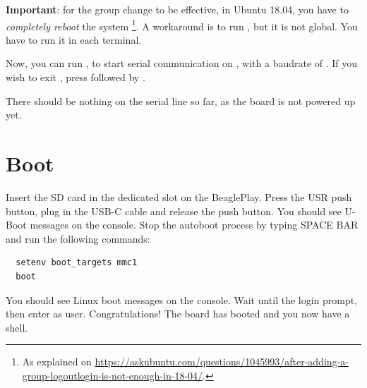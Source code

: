 
{\bf Important}: for the group change to be effective, in Ubuntu 18.04, you have to
{\em completely reboot} the system \footnote{As explained on
\url{https://askubuntu.com/questions/1045993/after-adding-a-group-logoutlogin-is-not-enough-in-18-04/}.}.
A workaround is to run , but it is not global.
You have to run it in each terminal.

Now, you can run , to start serial
communication on , with a baudrate of . If
you wish to exit , press \code{[Ctrl][a]} followed by
\code{[Ctrl][x]}.

There should be nothing on the serial line so far, as the board is not
powered up yet.

\section{Boot}

Insert the SD card in the dedicated slot on the BeaglePlay. Press the USR
push button, plug in the USB-C cable and
release the push button. You should see U-Boot messages on the console.
Stop the autoboot process by typing SPACE BAR and run the following commands:

\begin{verbatim}
  setenv boot_targets mmc1
  boot
\end{verbatim}

You should see Linux boot messages on the console.
Wait until the login prompt, then enter  as user.
Congratulations! The board has booted and you now have a shell.
